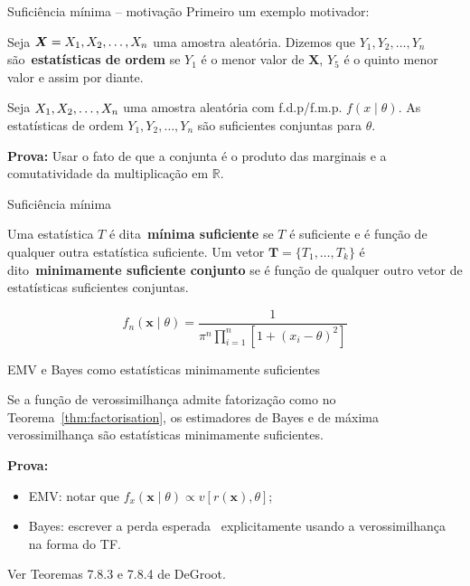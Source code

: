 \begin{frame}{Suficiência mínima -- motivação}
Primeiro um exemplo motivador:
\begin{defn}
 \label{def:order_statistics}
Seja $\boldsymbol{X} = X_1, X_2, \ldots, X_n$ uma amostra aleatória.
Dizemos que $Y_1, Y_2, \ldots, Y_n$ são~\textbf{estatísticas de ordem} se $Y_1$ é o menor valor de $\boldsymbol{X}$, $Y_5$ é o quinto menor valor e assim por diante.
\end{defn}
\begin{theo}
Seja $X_1, X_2, \ldots, X_n$ uma amostra aleatória com f.d.p/f.m.p. $f(x\mid\theta)$.
As estatísticas de ordem $Y_1, Y_2, \ldots, Y_n$ são suficientes conjuntas para $\theta$.
\end{theo}
\textbf{Prova:} Usar o fato de que a conjunta é o produto das marginais e a comutatividade da multiplicação em $\mathbb{R}$. 
\end{frame}

\begin{frame}{Suficiência mínima}
\begin{defn}
 \label{def:minimal_sufficiency}
 Uma estatística $T$ é dita~\textbf{mínima suficiente} se $T$ é suficiente e é função de qualquer outra estatística suficiente.
 Um vetor $\boldsymbol{T} =  \{T_1, \ldots, T_k \}$ é dito~\textbf{minimamente suficiente conjunto} se é função de qualquer outro vetor de estatísticas suficientes conjuntas.
\end{defn}
\begin{obs}
 \begin{equation}
  f_n(\boldsymbol{x} \mid \theta) = \frac{1}{\pi^n \prod_{i=1}^n\left[1 + (x_i-\theta)^2\right]}
 \end{equation}
\end{obs}
\end{frame}

\begin{frame}{EMV e Bayes como estatísticas minimamente suficientes}
 \begin{theo}
 \label{thm:MLE_Bayes_sufficient}
  Se a função de verossimilhança admite fatorização como no Teorema~\ref{thm:factorisation}, os  estimadores de Bayes e de máxima verossimilhança são estatísticas minimamente suficientes.
 \end{theo}
\textbf{Prova:}
\begin{itemize}
 \item EMV: notar que $f_x(\boldsymbol{x} \mid \theta) \propto v[r(\boldsymbol{x}), \theta]$;
 \item Bayes: escrever a perda esperada~ explicitamente usando a verossimilhança na forma do TF.
\end{itemize}
Ver Teoremas 7.8.3 e 7.8.4 de DeGroot.
\end{frame}


